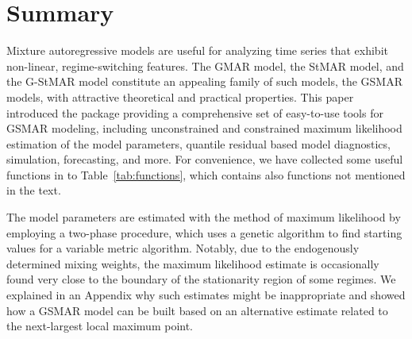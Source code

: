 \documentclass[nojss]{jss} %
\begin{document}

\section{Summary}\label{sec:summary}
Mixture autoregressive models are useful for analyzing time series that exhibit non-linear, regime-switching features. The GMAR model, the StMAR model, and the G-StMAR model constitute an appealing family of such models, the GSMAR models, with attractive theoretical and practical properties. This paper introduced the  package  providing a comprehensive set of easy-to-use tools for GSMAR modeling, including unconstrained and constrained maximum likelihood estimation of the model parameters, quantile residual based model diagnostics, simulation, forecasting, and more. For convenience, we have collected some useful functions in  to Table~\ref{tab:functions}, which contains also functions not mentioned in the text.

The model parameters are estimated with the method of maximum likelihood by employing a two-phase procedure, which uses a genetic algorithm to find starting values for a variable metric algorithm. Notably, due to the endogenously determined mixing weights, the maximum likelihood estimate is occasionally found very close to the boundary of the stationarity region of some regimes. We explained in an Appendix why such estimates might be inappropriate and showed how a GSMAR model can be built based on an alternative estimate related to the next-largest local maximum point.
\end{document}
